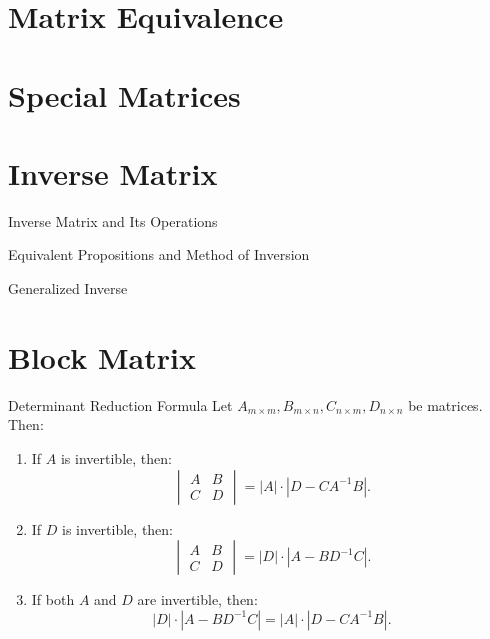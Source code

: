 \documentclass[11pt]{../../TexTemplate/elegantbook} %
\begin{document}
\section{Matrix Equivalence}

\section{Special Matrices}

\section{Inverse Matrix}
\begin{leftbarTitle}{Inverse Matrix and Its Operations}\end{leftbarTitle}

\begin{leftbarTitle}{Equivalent Propositions and Method of Inversion}\end{leftbarTitle}

\begin{leftbarTitle}{Generalized Inverse}\end{leftbarTitle}

\section{Block Matrix}

\begin{theorem}{Determinant Reduction Formula}
    Let \(A_{m\times m}, B_{m\times n}, C_{n\times m}, D_{n\times n}\) be matrices. Then:
    \begin{enumerate}
        \item If \( A \) is invertible, then:
            \[
            \begin{vmatrix}
            A & B \\
            C & D
            \end{vmatrix}
            = |A| \cdot |D - CA^{-1}B|.
            \]
        \item If \( D \) is invertible, then:
            \[
            \begin{vmatrix}
            A & B \\
            C & D
            \end{vmatrix}
            = |D| \cdot |A - BD^{-1}C|.
            \]
        \item If both \( A \) and \( D \) are invertible, then:
            \[
            |D| \cdot |A - BD^{-1}C| = |A| \cdot |D - CA^{-1}B|.
            \]
    \end{enumerate}
\end{theorem}
\end{document}
